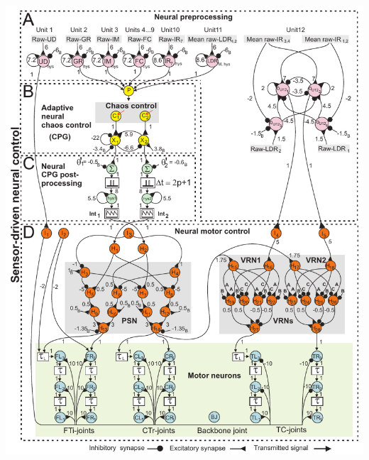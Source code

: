 \documentclass{beamer}
\begin{document}
\begin{minimalframe}
    \vspace*{0.5cm}
    \begin{columns}
   	\hspace*{-0.1cm}
 		\includegraphics[height=0.9\textheight]{figs/Processing-network-overview.pdf}
     

\end{columns}
\end{minimalframe}
\end{document}
